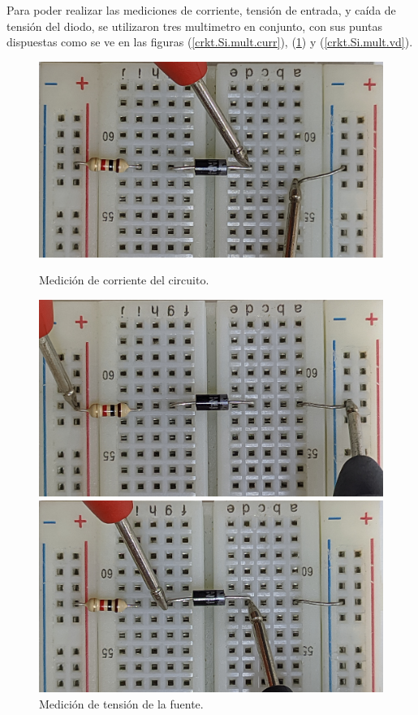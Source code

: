 \documentclass[chaptersright]{informeutn}
\begin{document}
      Para poder realizar las mediciones de corriente, tensión de entrada, y caída de tensión del diodo, se utilizaron
      tres multimetro en conjunto, con sus puntas dispuestas como se ve en las figuras (\ref{crkt.Si.mult.curr}),
      (\ref{crkt.Si.mult.vi}) y (\ref{crkt.Si.mult.vd}).
      \begin{figure}[H]
        \centering
        \begin{minipage}{0.3\textwidth}
          \includegraphics[angle=180, width=1\textwidth]{pictures/prot_crkt-1_curr.jpg}
          \caption{Medición de corriente del circuito.}
          \label{crkt.Si.mult.curr}
        \end{minipage}
        \begin{minipage}{0.3\textwidth}
          \includegraphics[angle=180, width=1\textwidth]{pictures/prot_crkt-1_vi.jpg}
          \caption{Medición de tensión de la fuente.}
          \label{crkt.Si.mult.vi}
        \end{minipage}
        \begin{minipage}{0.3\textwidth}
          \includegraphics[angle=180, width=1\textwidth]{pictures/prot_crkt-1_vd.jpg}

\end{minipage}
\end{figure}
\end{document}
